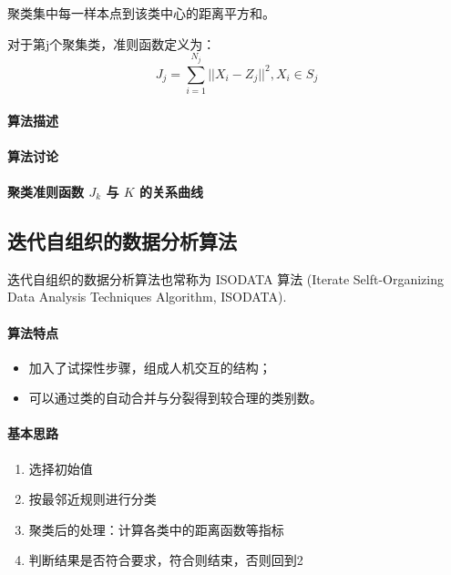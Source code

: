 \documentclass[11pt]{book}
\begin{document}
聚类集中每一样本点到该类中心的距离平方和。

对于第j个聚集类，准则函数定义为：
$$
   J_j	= \sum^{N_j}_{i=1} || X_i - Z_j ||^2, X_i \in S_j
$$

\paragraph{算法描述}%
\label{par:suan_fa_miao_shu_}

\paragraph{算法讨论}%
\label{par:suan_fa_tao_lun_}

\paragraph{聚类准则函数 $J_k$ 与 $K$ 的关系曲线}%
\label{par:ju_lei_zhun_ze_han_shu_j_k_yu_k_de_guan_xi_qu_xian_}

\subsection{迭代自组织的数据分析算法}%

迭代自组织的数据分析算法也常称为 ISODATA 算法 (Iterate Selft-Organizing Data Analysis Techniques Algorithm, ISODATA).

\paragraph{算法特点}%
\label{par:suan_fa_te_dian_}

\begin{itemize}
	\item 加入了试探性步骤，组成人机交互的结构；
	\item 可以通过类的自动合并与分裂得到较合理的类别数。
\end{itemize}

\paragraph{基本思路}%
\label{par:ji_ben_si_lu_}

\begin{enumerate}
	\item 选择初始值
	\item 按最邻近规则进行分类
	\item 聚类后的处理：计算各类中的距离函数等指标
	\item 判断结果是否符合要求，符合则结束，否则回到2
\end{enumerate}
\end{document}
